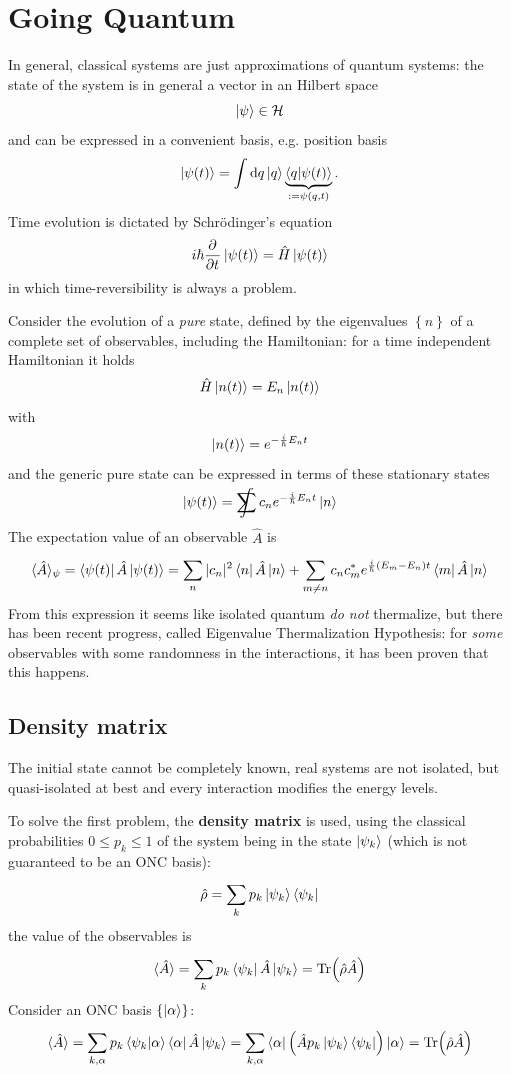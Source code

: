 \section{Going Quantum}
In general, classical systems are just approximations of quantum systems: the
state of the system is in general a vector in an Hilbert space
$$\ket{\psi}\in\mathcal{H}$$
and can be expressed in a convenient basis, e.g. position basis
$$\ket{\psi(t)} = \int \dd q \ket{q}\underbrace{\bra{q}\ket{\psi(t)}}_
{:=\psi(q,t)}.$$
Time evolution is dictated by Schrödinger's equation
$$i\hbar\pdv[]{}{t}\ket{\psi(t)} = \hat H \ket{\psi(t)}$$
in which time-reversibility is always a problem.

Consider the evolution of a \textit{pure} state, defined by the eigenvalues
$\left\{n\right\}$ of a complete set of observables, including the Hamiltonian:
for a time independent Hamiltonian it holds
$$\hat H\ket{n(t)}=E_n\ket{n(t)}$$
with
$$\ket{n(t)} = e^{-\frac{i}{\hbar}E_nt}$$
and the generic pure state can be expressed in terms of these stationary states
$$\ket{\psi(t)}=\sumint c_ne^{-\frac{i}{\hbar}E_nt}\ket{n}$$ 
The expectation value of an observable $\hat A$ is
$$\langle \hat A\rangle_\psi = \bra{\psi(t)}\hat A\ket{\psi(t)} = 
\sum_{n}^{}|c_n|^2\bra{n}\hat A\ket{n} + \sum_{m\neq n}^{} c_nc_m^*
e^{\frac{i}{\hbar}\left(E_m-E_n\right)t}\bra{m}\hat A\ket{n}$$
From this expression it seems like isolated quantum \textit{do not}
thermalize, but there has been recent progress, called Eigenvalue
Thermalization Hypothesis: for \textit{some} observables with some
randomness in the interactions, it has been proven that this happens.

\subsection{Density matrix}
The initial state cannot be completely known, real systems are not isolated,
but quasi-isolated at best and every interaction modifies the energy levels.

To solve the first problem, the \textbf{density matrix} is used, using the
classical probabilities $0\leq p_k\leq 1$ of the system being in the state
$\ket{\psi_k}$ (which is not guaranteed to be an ONC basis): 
$$\hat \rho = \sum_{k}^{}p_k\ket{\psi_k}\bra{\psi_k}$$
the value of the observables is
$$\langle \hat A \rangle = \sum_{k}^{}p_k\bra{\psi_k}\hat A\ket{\psi_k} = 
\Tr(\hat \rho\hat A)$$
Consider an ONC basis $\left\{\ket{\alpha}\right\}$:
$$\langle \hat A\rangle= \sum_{k,\alpha}^{}p_k\bra{\psi_k}\ket{\alpha}
\bra{\alpha}\hat A\ket{\psi_k} = \sum_{k,\alpha}^{}\bra{\alpha}\left(
 \hat A p_k\ket{\psi_k}\bra{\psi_k}\right)\ket{\alpha}=\Tr(\hat\rho\hat A)$$
